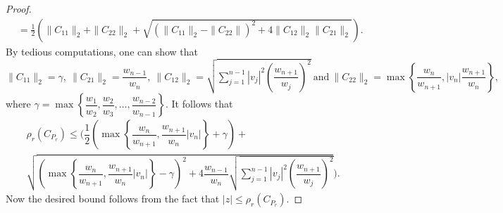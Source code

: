 \documentclass[10pt,a4paper]{amsart}
\begin{document}
\begin{proof}
\begin{align*}
		&= \frac{1}{2} \left( \|C_{11}\|_{2} + \|C_{22}\|_{2} + \sqrt{(\|C_{11}\|_{2} - \|C_{22}\|)^2 + 4 \|C_{12}\|_{2} \|C_{21}\|_{2}} \right).
	\end{align*}
	By tedious computations, one can show that $\|C_{11}\|_{2}=\gamma, ~\|C_{21}\|_{2}=\dfrac{w_{n-1}}{w_{n}}, ~\|C_{12}\|_{2}=\sqrt{\sum_{j=1}^{n-1}|v_{j}|^{2}\left(\dfrac{w_{n+1}}{w_{j}}\right)^{2}} ~\mbox{and}~\|C_{22}\|_{2}=\max\left\{\dfrac{w_{n}}{w_{n+1}},|v_{n}|\dfrac{w_{n+1}}{w_{n}}\right\},$ \\where $\gamma=\max\left\{\dfrac{w_{1}}{w_{2}} ,  \dfrac{w_{2}}{w_{3}},\dots,\dfrac{w_{n-2}}{w_{n-1}}           \right\}.$
	It follows that\\
	\begin{multline*}
		\rho_{r}(C_{P_{r}})\le \biggl(\dfrac{1}{2}                                  \left( \max \left\{ \dfrac{w_{n}}{w_{n+1}},\dfrac{w_{n+1}}{w_{n}}|v_{n}|\right\}+\gamma\right)+\\\sqrt{   \left( \max \left\{ \dfrac{w_{n}}{w_{n+1}},\dfrac{w_{n+1}}{w_{n}}|v_{n}|\right\}-\gamma\right)^{2}    +4\dfrac{w_{n-1}}{w_{n}} \sqrt{\sum_{j=1}^{n-1}|v_{j}|^{2}\left(\dfrac{w_{n+1}}{w_{j}}\right)^{2}}} \biggr).
	\end{multline*}
	Now the desired bound follows from the fact that $|z|\le \rho_{r}(C_{P_{r}}).$
\end{proof}
\end{document}
